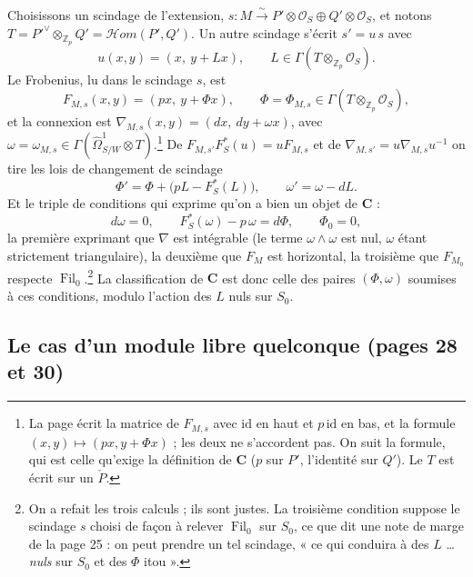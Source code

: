 \documentclass[11pt,a4paper]{article}
\begin{document}
Choisissons un scindage de l'extension,
$s\colon M \xrightarrow{\sim} P'\otimes\mathcal{O}_{S} \oplus
Q'\otimes\mathcal{O}_{S}$, et notons $T = P'^{\vee} \otimes_{\mathbb{Z}_{p}} Q'
= \mathcal{H}om(P', Q')$. Un autre scindage s'écrit $s' = u\,s$ avec
\[
u(x, y) = (x,\ y + Lx), \qquad L \in \Gamma(T \otimes_{\mathbb{Z}_{p}}
\mathcal{O}_{S}).
\]
Le Frobenius, lu dans le scindage $s$, est
\[
F_{M,s}(x, y) = (px,\ y + \Phi x), \qquad \Phi = \Phi_{M,s} \in
\Gamma(T \otimes_{\mathbb{Z}_{p}} \mathcal{O}_{S}),
\]
et la connexion est $\nabla_{M,s}(x, y) = (dx,\ dy + \omega x)$, avec
$\omega = \omega_{M,s} \in \Gamma(\hat\Omega^{1}_{S/W} \otimes T)$.\footnote{La
page écrit la matrice de $F_{M,s}$ avec $\mathrm{id}$ en haut et
$p\,\mathrm{id}$ en bas, et la formule $(x,y) \mapsto (px, y + \Phi x)$ ; les
deux ne s'accordent pas. On suit la formule, qui est celle qu'exige la
définition de $\mathbf{C}$ ($p$ sur $P'$, l'identité sur $Q'$). Le $T$ est
écrit sur un $\check P$.} De $F_{M,s'} F_{S}^{*}(u) = u F_{M,s}$ et de
$\nabla_{M,s'} = u\nabla_{M,s}u^{-1}$ on tire les lois de changement de
scindage
\[
\Phi' = \Phi + \bigl(pL - F_{S}^{*}(L)\bigr), \qquad \omega' = \omega - dL .
\]
Et le triple de conditions qui exprime qu'on a bien un objet de $\mathbf{C}$ :
\[
d\omega = 0, \qquad F_{S}^{*}(\omega) - p\,\omega = d\Phi, \qquad
\Phi_{0} = 0,
\]
la première exprimant que $\nabla$ est intégrable (le terme
$\omega \wedge \omega$ est nul, $\omega$ étant strictement triangulaire), la
deuxième que $F_{M}$ est horizontal, la troisième que $F_{M_{0}}$ respecte
$\operatorname{Fil}_{0}$.\footnote{On a refait les trois calculs ; ils sont
justes. La troisième condition suppose le scindage $s$ choisi de façon à
relever $\operatorname{Fil}_{0}$ sur $S_{0}$, ce que dit une note de marge de
la page 25 : on peut prendre un tel scindage, « ce qui conduira à des $L$
\ldots{} \emph{nuls} sur $S_{0}$ et des $\Phi$ itou ».} La classification de
$\mathbf{C}$ est donc celle des paires $(\Phi, \omega)$ soumises à ces
conditions, modulo l'action des $L$ nuls sur $S_{0}$.

\subsection*{Le cas d'un module libre quelconque (pages 28 et 30)}
\end{document}
